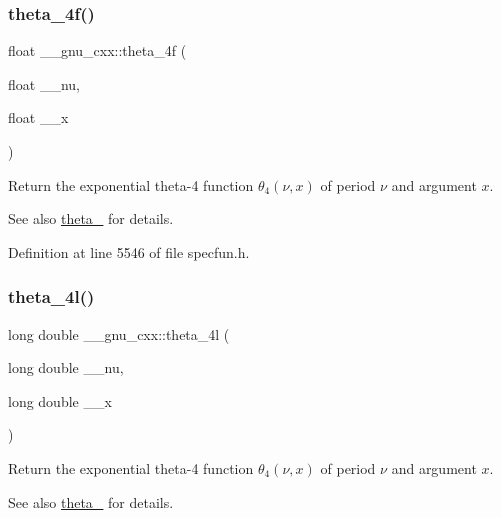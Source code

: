 \subsubsection{\texorpdfstring{theta\+\_\+4f()}{theta\_4f()}}
{\footnotesize\ttfamily float \+\_\+\+\_\+gnu\+\_\+cxx\+::theta\+\_\+4f (\begin{DoxyParamCaption}\item[{float}]{\+\_\+\+\_\+nu,  }\item[{float}]{\+\_\+\+\_\+x }\end{DoxyParamCaption})\hspace{0.3cm}{\ttfamily [inline]}}

Return the exponential theta-\/4 function $ \theta_4(\nu,x) $ of period $ \nu $ and argument $ x $.

\begin{DoxySeeAlso}{See also}
\hyperlink{group__gnu__math__spec__func_ga8a6f8b69272a9f205a13e1745832ada3}{theta\+\_} for details. 
\end{DoxySeeAlso}


Definition at line 5546 of file specfun.\+h.

\mbox{\label{group__gnu__math__spec__func_gaaf63a80e90cdcdd66ebb18cd3a84afae}} 
\subsubsection{\texorpdfstring{theta\+\_\+4l()}{theta\_4l()}}
{\footnotesize\ttfamily long double \+\_\+\+\_\+gnu\+\_\+cxx\+::theta\+\_\+4l (\begin{DoxyParamCaption}\item[{long double}]{\+\_\+\+\_\+nu,  }\item[{long double}]{\+\_\+\+\_\+x }\end{DoxyParamCaption})\hspace{0.3cm}{\ttfamily [inline]}}

Return the exponential theta-\/4 function $ \theta_4(\nu,x) $ of period $ \nu $ and argument $ x $.

\begin{DoxySeeAlso}{See also}
\hyperlink{group__gnu__math__spec__func_ga8a6f8b69272a9f205a13e1745832ada3}{theta\+\_} for details. 
\end{DoxySeeAlso}



